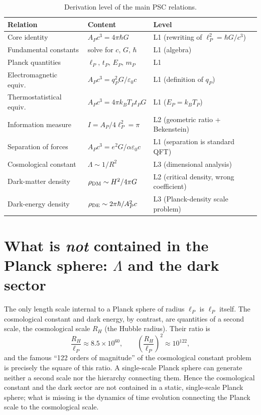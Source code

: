 \documentclass[11pt,a4paper]{article}
\newcommand{\eP}{\ell_P}
\begin{document}
\begin{table}[t]
\centering\small
\begin{tabular}{@{}lll@{}}
\toprule
Relation & Content & Level \\
\midrule
Core identity & $A_P c^3 = 4\pi\hbar G$ & L1 (rewriting of $\eP^2=\hbar G/c^3$) \\
Fundamental constants & solve for $c,\,G,\,\hbar$ & L1 (algebra) \\
Planck quantities & $\eP,\,t_P,\,E_P,\,m_P$ & L1 \\
Electromagnetic equiv.\ & $A_P c^3 = q_P^2 G/\varepsilon_0 c$ & L1 (definition of $q_P$) \\
Thermostatistical equiv.\ & $A_P c^3 = 4\pi k_B T_P t_P G$ & L1 ($E_P=k_B T_P$) \\
Information measure & $I = A_P/4\eP^2 = \pi$ & L2 (geometric ratio + Bekenstein) \\
Separation of forces & $A_P c^3 = e^2 G/\alpha\varepsilon_0 c$ & L1 (separation is standard QFT) \\
Cosmological constant & $\Lambda \sim 1/R^2$ & L3 (dimensional analysis) \\
Dark-matter density & $\rho_{\rm DM}\sim H^2/4\pi G$ & L2 (critical density, wrong coefficient) \\
Dark-energy density & $\rho_{\rm DE}\sim 2\pi\hbar/A_P^2 c$ & L3 (Planck-density scale problem) \\
\bottomrule
\end{tabular}
\caption{Derivation level of the main PSC relations.}
\label{tab:audit}
\end{table}

\section{What is \emph{not} contained in the Planck sphere: $\Lambda$ and the dark sector}
The only length scale internal to a Planck sphere of radius $\eP$ is $\eP$ itself. The cosmological constant and dark energy, by contrast, are quantities of a second scale, the cosmological scale $R_H$ (the Hubble radius). Their ratio is
\begin{equation}
\frac{R_H}{\eP}\approx 8.5\times10^{60},\qquad \left(\frac{R_H}{\eP}\right)^2\approx 10^{122},
\end{equation}
and the famous ``122 orders of magnitude'' of the cosmological constant problem is precisely the square of this ratio. A single-scale Planck sphere can generate neither a second scale nor the hierarchy connecting them. Hence the cosmological constant and the dark sector are not contained in a static, single-scale Planck sphere; what is missing is the dynamics of time evolution connecting the Planck scale to the cosmological scale.
\end{document}
